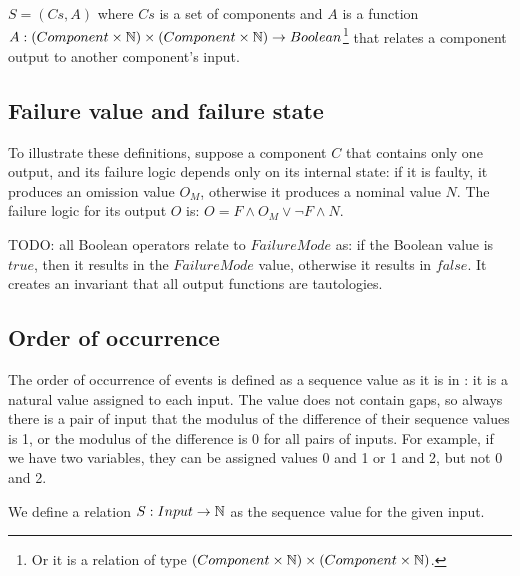 \begin{definition}
$S = \left(Cs, A\right)$
\noindent where $Cs$ is a set of components and $A$ is a function $A : (Component \times \mathbb{N}) \times (Component \times \mathbb{N}) \rightarrow Boolean$\footnote{Or it is a relation of type $(Component \times \mathbb{N}) \times (Component \times \mathbb{N})$.} that relates a component output to another component's input.
\end{definition}

\subsection{Failure value and failure state}

%
%

To illustrate these definitions, suppose a component $C$ that contains only one output, and its failure logic depends only on its internal state: if it is faulty, it produces an omission value $O_M$, otherwise it produces a nominal value $N$. 
%
The failure logic for its output $O$ is: $O = F \land O_M \lor \lnot F \land N$.

TODO: all Boolean operators relate to $FailureMode$ as: if the Boolean value is $true$, then it results in the $FailureMode$ value, otherwise it results in $false$. It creates an invariant that all output functions are tautologies.

\subsection{Order of occurrence}

The order of occurrence of events is defined as a sequence value as it is in \HIPHOPS: it is a natural value assigned to each input.
%
The value does not contain gaps, so always there is a pair of input that the modulus of the difference of their sequence values is 1, or the modulus of the difference is 0 for all pairs of inputs.
%
For example, if we have two variables, they can be assigned values 0 and 1 or 1 and 2, but not 0 and 2. 

We define a relation $S : Input \rightarrow \mathbb{N} $ as the sequence value for the given input.